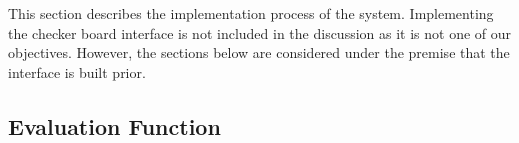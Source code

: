 \documentclass[12pt,a4paper]{article}
\begin{document}

        
    This section describes the implementation process of the system. Implementing the checker board interface is not included in the discussion as it is not one of our objectives. However, the sections below are considered under the premise that the interface is built prior.

    \subsection{Evaluation Function}
\end{document}
